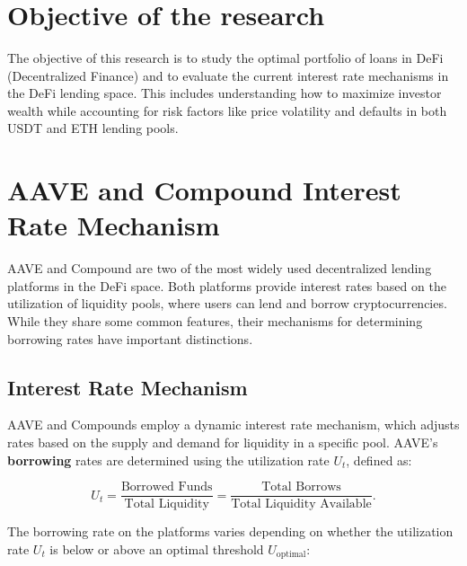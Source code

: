 \documentclass{article} %
\theoremstyle{plain}
\theoremstyle{definition} %
\begin{document}
\setlength{\boxlength}{0.95\textwidth} %
\title{\large{\bf{}}} %
\author{{\normalsize\bf{}}}%
\thispagestyle{empty}
\addtocounter{page}{1}
\maketitle

\vspace{.5cm}
\def\contentsname{Contents}
\tableofcontents
\vspace{.5cm}


\section{Objective of the research}

The objective of this research is to study the optimal portfolio of loans in DeFi (Decentralized Finance) and to evaluate the current interest rate mechanisms in the DeFi lending space. This includes understanding how to maximize investor wealth while accounting for risk factors like price volatility and defaults in both USDT and ETH lending pools.

\section{AAVE and Compound Interest Rate Mechanism}

AAVE and Compound are two of the most widely used decentralized lending platforms in the DeFi space. Both platforms provide interest rates based on the utilization of liquidity pools, where users can lend and borrow cryptocurrencies. While they share some common features, their mechanisms for determining borrowing rates have important distinctions.

\subsection{Interest Rate Mechanism}

AAVE and Compounds employ a dynamic interest rate mechanism, which adjusts rates based on the supply and demand for liquidity in a specific pool.
 AAVE’s \textbf{borrowing} rates are determined using the utilization rate \(U_t\), defined as:

\[
U_t = \frac{\text{Borrowed Funds}}{\text{Total Liquidity}} = \frac{\text{Total Borrows}}{\text{Total Liquidity Available}}.
\]

The borrowing rate on the platforms varies depending on whether the utilization rate \( U_t \) is below or above an optimal threshold \( U_{\text{optimal}} \):
\end{document}
